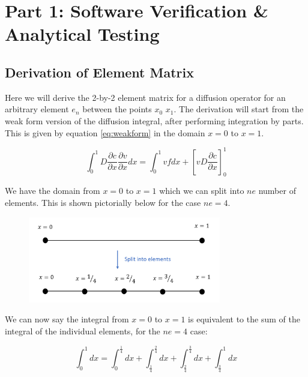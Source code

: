 \documentclass[11pt]{article}
\begin{document}

\printnomenclature


\clearpage
{}
\section{Part 1: Software Verification \& Analytical Testing}

\subsection{Derivation of Element Matrix}

Here we will derive the 2-by-2 element matrix for a diffusion operator for an arbitrary element $e_{n}$ between the points $x_{0}$ $x_{1}$. The derivation will start from the weak form version of the diffusion integral, after performing integration by parts. This is given by equation \ref{eq:weakform} in the domain $x = 0$ to $x = 1$.

\begin{equation} \label{eq:weakform}
\int_0^1 D \frac{\partial c}{\partial x}  \frac{\partial v}{\partial x}  dx = \int_0^1 vf dx + \left[vD\frac{\partial c}{\partial x} \right]_0^1
\end{equation}

We have the domain from $x = 0$ to $ x = 1$ which we can split into $ne$ number of elements. This is shown pictorially below for the case $ne = 4$.

\begin{figure}[h!]
\centering
\includegraphics[width=0.75\textwidth]{SplitIntoElements.PNG}
\end{figure}

We can now say the integral from $x = 0$ to $x = 1$ is equivalent to the sum of the integral of the individual elements, for the $ne = 4$ case:


\begin{equation}
\int_0^1 dx = \int_0^\frac{1}{4}  dx + \int_\frac{1}{4}^\frac{2}{4}  dx + \int_\frac{2}{4}^\frac{3}{4}  dx + \int_\frac{3}{4}^1  dx
\end{equation}
\end{document}
